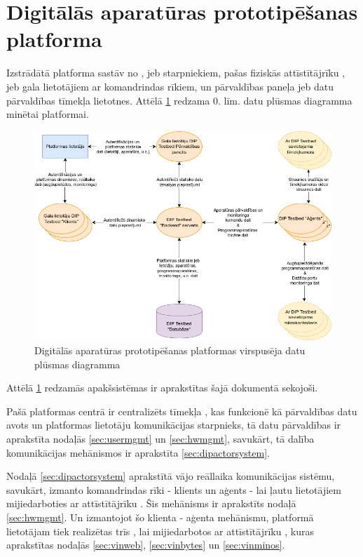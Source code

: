 \section{Digitālās aparatūras prototipēšanas platforma}
\label{sec:dipplatform}

Izstrādātā platforma sastāv no ,
 jeb  starpniekiem, pašas
fiziskās attīstītājrīku , 
jeb gala lietotājiem ar komandrindas rīkiem, un pārvaldības paneļa jeb datu
pārvaldības tīmekļa lietotnes. Attēlā \ref{fig:dipdpd0} redzama 0. līm. datu
plūsmas diagramma minētai platformai. 

\begin{figure}[H]
    \includegraphics[width=1.0\linewidth]{assets/DPD0.drawio.png}
    \centering
    \caption{Digitālās aparatūras prototipēšanas platformas virspusēja datu plūsmas diagramma}
    \label{fig:dipdpd0}
\end{figure}

Attēlā \ref{fig:dipdpd0} redzamās apakšsistēmas ir aprakstītas šajā dokumentā
sekojoši. 

Pašā platformas centrā ir centralizēts tīmekļa , kas
funkcionē kā pārvaldības datu avots un platformas lietotāju komunikācijas
starpnieks, tā datu pārvaldības ir aprakstīta nodaļās \ref{sec:usermgmt} un
\ref{sec:hwmgmt}, savukārt, tā dalība komunikācijas mehānismos ir aprakstīta
\ref{sec:dipactorsystem}.

Nodaļā \ref{sec:dipactorsystem} aprakstītā vājo reāllaika komunikācijas sistēmu,
savukārt, izmanto komandrindas rīki - klients un aģents - lai ļautu lietotājiem
mijiedarboties ar attīstītājrīku . Šis mehānisms ir
aprakstīts nodaļā \ref{sec:hwmgmt}. Un izmantojot šo klienta - aģenta mehānismu,
platformā lietotājam tiek realizētas trīs , lai
mijiedarbotos ar attīstītājrīku , kuras aprakstītas
nodaļās \ref{sec:vinweb}, \ref{sec:vinbytes} un \ref{sec:vinminos}.

